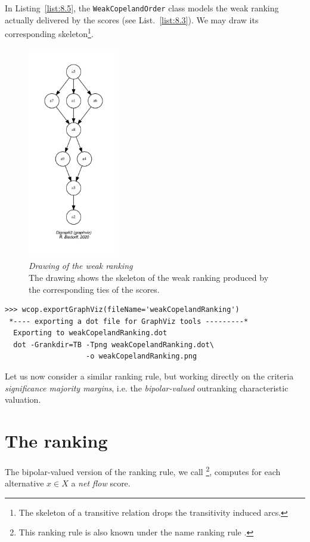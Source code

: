 In Listing~\vref{list:8.5}, the \texttt{WeakCopelandOrder} class models the weak ranking actually delivered by the \Copeland scores (see List.~\vref{list:8.3}). We may draw its corresponding skeleton\footnote{The skeleton of a transitive relation drops the transitivity induced arcs.}.
\begin{figure}[ht]
\sidecaption[t]
\includegraphics[width=4cm]{Figures/8-2-weakCopelandRanking.pdf}
\caption[Drawing of the weak \Copeland ranking]{\emph{Drawing of the weak \Copeland ranking}\\ The drawing shows the skeleton of the weak ranking produced by the corresponding ties of the \Copeland scores.}
\label{fig:8.2}       %
\end{figure}
\begin{lstlisting}
>>> wcop.exportGraphViz(fileName='weakCopelandRanking')
 *---- exporting a dot file for GraphViz tools ---------*
  Exporting to weakCopelandRanking.dot
  dot -Grankdir=TB -Tpng weakCopelandRanking.dot\
                   -o weakCopelandRanking.png
\end{lstlisting}

Let us now consider a similar ranking rule, but working directly on the criteria \emph{significance majority margins}, i.e. the \emph{bipolar-valued} outranking characteristic valuation.

\section{The \NetFlows ranking}
\label{sec:8.3}

The bipolar-valued version of the \Copeland ranking rule, we call \NetFlows \footnote{This ranking rule is also known under the name \Promethee ranking rule \citep*{BRA-1985}.}, computes for each alternative $x \in X$ a \emph{net flow} score.

